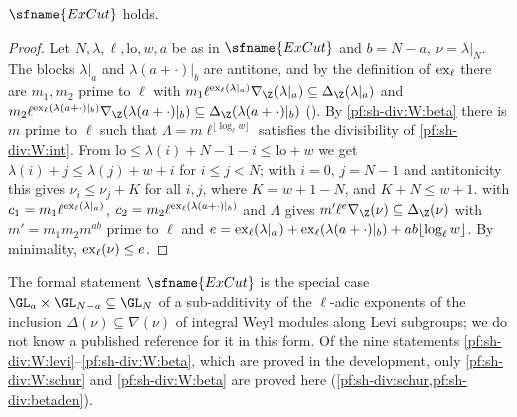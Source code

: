 \begin{theorem}\label{pf:sh-div:excut}
$\sfname{ExCut}$ holds.
\end{theorem}

\begin{proof}
Let $N,\lambda,\ell,\mathrm{lo},w,a$ be as in $\sfname{ExCut}$ and $b=N-a$, $\nu=\lambda|_N$. The blocks $\lambda|_a$ and $\lambda(a+\cdot)|_b$ are
antitone, and by the definition of $\operatorname{ex}_\ell$ there are $m_1,m_2$ prime to $\ell$ with $m_1\ell^{\shdivex_\ell(\lambda|_a)}\nabla_\Z(\lambda|_a)\subseteq
\Delta_\Z(\lambda|_a)$ and $m_2\ell^{\shdivex_\ell(\lambda(a+\cdot)|_b)}\nabla_\Z(\lambda(a+\cdot)|_b)\subseteq\Delta_\Z(\lambda(a+\cdot)|_b)$
(). By \ref{pf:sh-div:W:beta} there is $m$ prime to $\ell$ such that
$\Lambda=m\ell^{\lfloor\log_\ell w\rfloor}$ satisfies the divisibility of \ref{pf:sh-div:W:int}. From $\mathrm{lo}\le\lambda(i)+N-1-i\le\mathrm{lo}+w$ we get
$\lambda(i)+j\le\lambda(j)+w+i$ for $i\le j<N$; with $i=0$, $j=N-1$ and antitonicity this gives $\nu_i\le\nu_j+K$ for all $i,j$, where
$K=w+1-N$, and $K+N\le w+1$.  with $c_1=m_1\ell^{\operatorname{ex}_\ell(\lambda|_a)}$, $c_2=m_2\ell^{\operatorname{ex}_\ell(\lambda(a+\cdot)|_b)}$
and $\Lambda$ gives $m'\ell^{e}\nabla_\Z(\nu)\subseteq\Delta_\Z(\nu)$ with $m'=m_1m_2m^{ab}$ prime to $\ell$ and
$e=\operatorname{ex}_\ell(\lambda|_a)+\operatorname{ex}_\ell(\lambda(a+\cdot)|_b)+ab\lfloor\log_\ell w\rfloor$. By minimality, $\operatorname{ex}_\ell(\nu)\le e$.
\end{proof}

\begin{remark}\label{pf:sh-div:rem:excut}
The formal statement $\sfname{ExCut}$ is the special case $\GL_a\times\GL_{N-a}\subseteq\GL_N$ of a sub-additivity of the $\ell$-adic
exponents of the inclusion $\Delta(\nu)\subseteq\nabla(\nu)$ of integral Weyl modules \cite{Jantzen2003} along Levi subgroups; we do not know
a published reference for it in this form. Of the nine statements \ref{pf:sh-div:W:levi}--\ref{pf:sh-div:W:beta}, which are proved in the development, only
\ref{pf:sh-div:W:schur} and \ref{pf:sh-div:W:beta} are proved here (\cref{pf:sh-div:schur,pf:sh-div:betaden}).
\end{remark}
